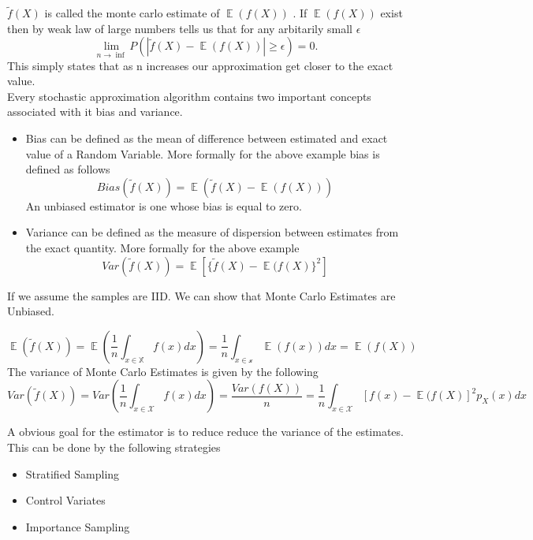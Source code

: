 \documentclass[a4paper,twoside]{iiththesis}
\theoremstyle{definition}
\theoremstyle{definition}
\theoremstyle{remark}
\DeclareMathOperator*{\E}{\mathop{\mathbb{E}}}
\begin{document}
$\widetilde{f}(X)$ is called the monte carlo estimate of $\E (f(X))$ . If $\E (f(X))$ exist then by weak law of large numbers tells us that for any arbitarily small $\epsilon$
\begin{equation}
	 \lim_{n\rightarrow \inf} P (|\widetilde{f}(X)  - \E (f(X))| \geq \epsilon)=0.
\end{equation}
This simply states that as n increases our approximation get closer to the exact value. \\
Every stochastic approximation algorithm contains two important  concepts associated with it bias and variance. 
\begin{itemize}
\item Bias can be defined as the mean of difference between estimated and exact value of a Random Variable. 
More formally for the above example bias is defined as follows 
\begin{equation}
	Bias(\widetilde{f}(X)) = \E (\widetilde{f}(X) - \E (f(X)))
\end{equation}
An unbiased estimator is one whose bias is equal to zero.
\\
\item Variance can be defined as the measure of dispersion between  estimates from the exact quantity. More formally for the above example 
\begin{equation}
	Var (\widetilde{f}(X)) = \E [\{\widetilde{f}(X) - \E (f(X)\}^2]
\end{equation}
\end{itemize}
\newtheorem{lemma}[theorem]{Lemma}
If we assume the samples are IID. We can show that Monte Carlo Estimates are Unbiased.

\begin{equation}
	\E (\tilde{f}(X)) = \E \left(\frac{1}{n} \int_{x\in \mathbb{X}} f(x) dx\right) = \frac{1}{n} \int_{x \in \mathcal{x}} \E (f(x)) dx= \E (f(X)) 
    \end{equation}
The variance of Monte Carlo Estimates is given by the following 
\begin{equation}
Var(\tilde{f}(X)) = Var\left(\frac{1}{n}\int_{x \in \mathcal{X}} f(x) dx\right) = \frac{Var(f(X))}{n} = \frac{1}{n} \int_{x\in\mathcal{X}} [f(x) - \E (f(X)]^2 p_{X}(x) dx
\end{equation}


A obvious goal for the estimator is to reduce reduce the variance of the estimates. This can be done by the following strategies 
\begin{itemize}
\item Stratified Sampling 
\item Control Variates 
\item Importance Sampling
\end{itemize}
\end{document}
